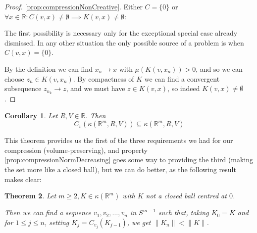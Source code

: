 \documentclass[a4paper,11pt]{article}
\newcommand{\bbR}{\mathbb{R}}
\newcommand{\lV}{\lVert}
\newcommand{\rV}{\rVert}
\newtheorem{thm}{Theorem}[section]
\newtheorem{corollary}[thm]{Corollary}
\begin{document}
\begin{proof}
\ref{prop:compressionNonCreative}. Either $C=\{0\}$ or
	$\forall x\in\bbR:C(v,x)\not=\emptyset\implies K(v,x)\not=\emptyset$:

The first possibility is necessary only for the exceptional special case
already dismissed.  In any other situation the only possible source of a
problem is when $C(v,x)=\{0\}$.

By the definition we can find $x_n\to x$ with $\mu(K(v,x_n))>0$, and so we can
choose $z_n\in K(v,x_n)$.  By compactness of $K$ we can find a convergent
subsequence $z_{n_k}\to z$, and we must have $z\in K(v,x)$, so indeed
$K(v,x)\not=\emptyset$.
\end{proof}

\begin{corollary}
\label{thm:compressionNice}
Let $R,V\in\bbR$.  Then
\[
C_v(\kappa(\bbR^m,R,V))\subseteq\kappa(\bbR^m,R,V)
\]
\end{corollary}

This theorem provides us the first of the three requirements we had for our
compression (volume-preserving),
and property \ref{prop:compressionNormDecreasing} goes some way to
providing the third (making the set more like a closed ball),
but we can do better, as the following result makes clear:

\begin{thm}
\label{thm:compressionStrictlyNormDecreasing}
Let $m\geq2, K\in\kappa(\bbR^m)$ with $K$ not a closed ball centred at $0$.

Then we can find a sequence $v_1,v_2,\ldots,v_n$
in $S^{m-1}$ such that, taking $K_0=K$ and for $1\leq j\leq n$, setting
$K_j=C_{v_j}(K_{j-1})$, we get $\lV K_n\rV<\lV K\rV$.
\end{thm}
\end{document}
